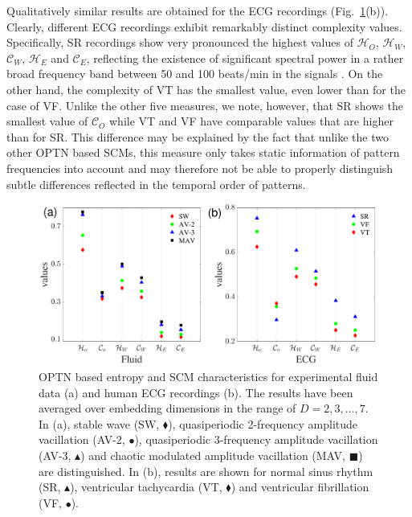 \documentclass[12pt,aip,cha,reprint,nofootinbib]{revtex4-1}
\begin{document}
Qualitatively similar results are obtained for the ECG recordings (Fig.~\ref{fig:fluid}(b)). Clearly, different ECG recordings exhibit remarkably distinct complexity values. Specifically, SR recordings show very pronounced the highest values of $\mathcal{H}_O$, $\mathcal{H}_W$, $\mathcal{C}_W$, $\mathcal{H}_E$ and $\mathcal{C}_E$, reflecting the existence of significant spectral power in a rather broad frequency band between 50 and 100 beats/min in the signals \cite{smallCSF2002}. On the other hand, the complexity of VT has the smallest value, even lower than for the case of VF. Unlike the other five measures, we note, however, that SR shows the smallest value of $\mathcal{C}_O$ while VT and VF have comparable values that are higher than for SR. This difference may be explained by the fact that unlike the two other OPTN based SCMs, this measure only takes static information of pattern frequencies into account and may therefore not be able to properly distinguish subtle differences reflected in the temporal order of patterns.

\begin{figure}
	\centering 
	\includegraphics[width=2\columnwidth]{fluidExample.pdf}
\caption{\small{OPTN based entropy and SCM characteristics for experimental fluid data (a) and human ECG recordings (b). The results have been averaged over embedding dimensions in the range of $D = 2, 3, \ldots, 7$. In (a), stable wave (SW, $\blacklozenge$), quasiperiodic 2-frequency amplitude vacillation (AV-2, $\bullet$), quasiperiodic 3-frequency amplitude vacillation (AV-3, $\blacktriangle$) and chaotic modulated amplitude vacillation (MAV, $\blacksquare$) are distinguished. In (b), results are shown for normal sinus rhythm (SR, $\blacktriangle$), ventricular tachycardia (VT, $\blacklozenge$) and ventricular fibrillation (VF, $\bullet$). } \label{fig:fluid}}
\end{figure}
\end{document}
